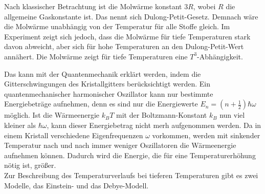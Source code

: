 Nach klassischer Betrachtung ist die Molwärme konstant $3R$, wobei $R$ die allgemeine Gaskonstante ist. Das nennt sich Dulong-Petit-Gesetz. 
Demnach wäre die Molwärme unabhängig von der Temperatur für alle Stoffe gleich. 
Im Experiment zeigt sich jedoch, dass die Molwärme für tiefe Temperaturen stark davon abweicht, aber sich für 
hohe Temperaturen an den Dulong-Petit-Wert annähert. Die Molwärme zeigt für tiefe Temperaturen eine $T^3$-Abhängigkeit. 


Das kann mit der Quantenmechanik erklärt werden, indem die Gitterschwingungen des Kristallgitters 
berücksichtigt werden. Ein quantenmechanischer harmonischer Oszillator kann nur bestimmte Energiebeträge aufnehmen, 
denn es sind nur die Energiewerte $ E_{\si{n}} = (n+\frac{1}{2}) \hbar \omega $ möglich. Ist die Wärmeenergie $k_{\si{B}}T$ mit der Boltzmann-Konstant $k_{\si{B}}$
nun viel kleiner als $\hbar\omega$, kann dieser Energiebetrag nicht merh aufgenommen werden. 
Da in einem Kristall verschiedene Eigenfrequenzen $\omega$ vorkommen, werden mit sinkender Temperatur nach und nach immer weniger 
Oszillatoren die Wärmeenergie aufnehmen können. Dadurch wird die Energie, die für eine Temperaturerhöhung nötig ist, größer. 
\\

Zur Beschreibung des Temperaturverlaufs bei tieferen Temperaturen gibt es zwei Modelle, das Einstein- und das Debye-Modell. 






